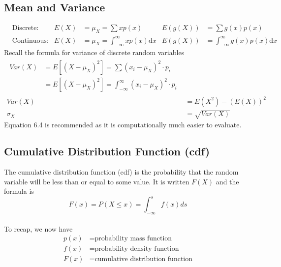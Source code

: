 \subsection{Mean and Variance}  %
\begin{align}
     & \text{Discrete:}   & E(X) & =\mu_X=\sum xp(x)                             & E(g(X)) & =\sum g(x)p(x)                            \\
     & \text{Continuous:} & E(X) & =\mu_X=\int_{-\infty}^{\infty} xp(x)\text{d}x & E(g(X)) & =\int_{-\infty}^{\infty}g(x)p(x)\text{d}x
\end{align}
Recall the formula for variance of discrete random variables
\begin{align}
    \begin{split}
        Var(X) & =E[{(X-\mu_X)}^2]=\sum{(x_i-\mu_X)}^2\cdot p_i                  \\
               & =E[{(X-\mu_X)}^2]=\int_{-\infty}^\infty{(x_i-\mu_X)}^2\cdot p_i
    \end{split} \\
    Var(X)   & =E(X^2)-(E(X))^2                                              \\
    \sigma_X & =\sqrt{Var(X)}
\end{align}
Equation 6.4 is recommended as it is computationally much easier to evaluate.

\subsection{Cumulative Distribution Function (cdf)}  %
The cumulative distribution function (cdf) is the probability that the random variable will be less than or equal to some value. It is written $F(X)$ and the formula is
\begin{equation}
    F(x)=P(X\leq x)=\int_{-\infty}^{s} f(x)ds
\end{equation}
\\
To recap, we now have
\begin{align}
    p(x) & = \text{probability mass function}        \\
    f(x) & = \text{probability density function}     \\
    F(x) & = \text{cumulative distribution function}
\end{align}


